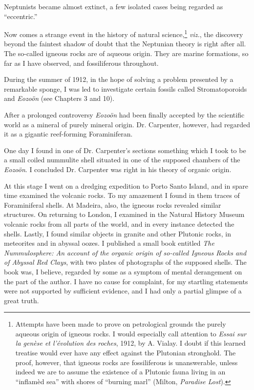\documentclass[a4paper, 12pt, oneside]{article}
\begin{document}
Neptunists became almost extinct, a few isolated cases being regarded as ``eccentric.''

Now comes a strange event in the history of natural science,\footnote{Attempts have been made to prove on petrological grounds the purely aqueous origin of igneous rocks. I would especially call attention to \emph{Essai sur la genèse et l'évolution des roches}, 1912, by A. Vialay. I doubt if this learned treatise would ever have any effect against the Plutonian stronghold. The proof, however, that igneous rocks are fossiliferous is unanswerable, unless indeed we are to assume the existence of a Plutonic fauna living in an ``inflamèd sea'' with shores of ``burning marl'' (Milton, \emph{Paradise Lost}).} \emph{viz.}, the discovery beyond the faintest shadow of doubt that the Neptunian theory is right after all. The so-called igneous rocks are of aqueous origin. They are marine formations, so far as I have observed, and fossiliferous throughout.

During the summer of 1912, in the hope of solving a problem presented by a remarkable sponge, I was led to investigate certain fossils called Stromatoporoids and \emph{Eozoön} (see Chapters 3 and 10).

After a prolonged controversy \emph{Eozoön} had been finally accepted by the scientific world as a mineral of purely mineral origin. Dr. Carpenter, however, had regarded it as a gigantic reef-forming Foraminiferan.

One day I found in one of Dr. Carpenter's sections something which I took to be a small coiled nummulite shell situated in one of the supposed chambers of the \emph{Eozoön}. I concluded Dr. Carpenter was right in his theory of organic origin.

At this stage I went on a dredging expedition to Porto Santo Island, and in spare time examined the volcanic rocks. To my amazement I found in them traces of Foraminiferal shells. At Madeira, also, the igneous rocks revealed similar structures. On returning to London, I examined in the Natural History Museum volcanic rocks from all parts of the world, and in every instance detected the shells. Lastly, I found similar objects in granite and other Plutonic rocks, in meteorites and in abyssal oozes. I published a small book entitled \emph{The Nummulosphere: An account of the organic origin of so-called Igneous Rocks and of Abyssal Red Clays}, with two plates of photographs of the supposed shells. The book was, I believe, regarded by some as a symptom of mental derangement on the part of the author. I have no cause for complaint, for my startling statements were not supported by sufficient evidence, and I had only a partial glimpse of a great truth.
\end{document}
